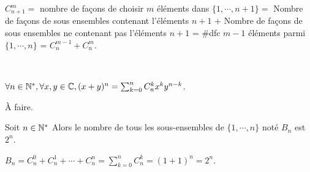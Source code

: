 \documentclass[a4paper, 12pt]{article}
\begin{document}
\begin{demonstration}[2]
    $C^m_{n+1} =$ nombre de façons de choisir $m$ éléments dans $\{1, \cdots, n+1\} =$ Nombre de façons de sous ensembles contenant l'éléments $n + 1$ + Nombre de façons de sous ensembles ne contenant pas l'éléments $n + 1$ = \#dfc $m-1$ éléments parmi $\{1, \cdots, n\}$ = $C^{m-1}_n + C^m_n$.
\end{demonstration}


\begin{theorem}\

    $\forall n \in \mathbb{N}^*, \forall x, y \in \mathbb{C}, (x + y)^n = \sum_{k = 0}^{n} C^k_n x^k y^{n-k}$.
\end{theorem}

\begin{demonstration}
    À faire.
\end{demonstration}

\begin{proposition}
    Soit $n \in \mathbb{N}^*$
    Alors le nombre de tous les sous-ensembles de $\{1, \cdots, n\}$ noté $B_n$ est $2^n$.
\end{proposition}

\begin{demonstration}[1]
    $B_n = C^0_n + C^1_n + \cdots + C^n_n = \sum_{k = 0}^{n} C^k_n = (1 + 1)^n = 2^n$.
\end{demonstration}
\end{document}
